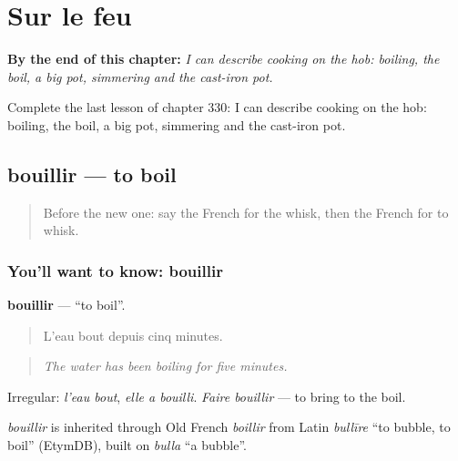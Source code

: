 
\chapter{Sur le feu}
\label{ch:fr-sur-le-feu}

\begin{chapteropening}
\textbf{By the end of this chapter:} \emph{I can describe cooking on the hob: boiling, the boil, a big pot, simmering and the cast-iron pot.}

Complete the last lesson of chapter 330: I can describe cooking on the hob: boiling, the boil, a big pot, simmering and the cast-iron pot.
\end{chapteropening}

\section[bouillir]{bouillir — to boil}

\label{lesson:FR-C330-bouillir}



\begin{quote}
Before the new one: say the French for the whisk, then the French for to whisk.
\end{quote}

\subsection*{You'll want to know: bouillir}
\textbf{bouillir} — \textquotedblleft{}to boil\textquotedblright{}.

\begin{quote}
L'eau bout depuis cinq minutes.
\end{quote}

\begin{quote}
\emph{The water has been boiling for five minutes.}
\end{quote}

Irregular: \emph{l'eau bout}, \emph{elle a bouilli}. \emph{Faire bouillir} — to bring to the boil.

\begin{cousinweb}
\emph{bouillir} is inherited through Old French \emph{boillir} from Latin \emph{bullīre} \textquotedblleft{}to bubble, to boil\textquotedblright{} (EtymDB), built on \emph{bulla} \textquotedblleft{}a bubble\textquotedblright{}.
\end{cousinweb}

